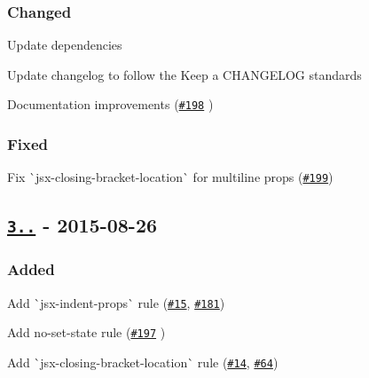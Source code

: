 \subsubsection*{Changed}


\begin{DoxyItemize}
\item Update dependencies
\item Update changelog to follow the Keep a C\+H\+A\+N\+G\+E\+L\+OG standards
\item Documentation improvements (\href{https://github.com/yannickcr/eslint-plugin-react/pull/198}{\tt \#198} )
\end{DoxyItemize}

\subsubsection*{Fixed}


\begin{DoxyItemize}
\item Fix \`{}jsx-\/closing-\/bracket-\/location\`{} for multiline props (\href{https://github.com/yannickcr/eslint-plugin-react/issues/199}{\tt \#199})
\end{DoxyItemize}

\subsection*{\href{https://github.com/yannickcr/eslint-plugin-react/compare/v3.2.3...v3.3.0}{\tt 3..} -\/ 2015-\/08-\/26}

\subsubsection*{Added}


\begin{DoxyItemize}
\item Add \`{}jsx-\/indent-\/props\`{} rule (\href{https://github.com/yannickcr/eslint-plugin-react/issues/15}{\tt \#15}, \href{https://github.com/yannickcr/eslint-plugin-react/issues/181}{\tt \#181})
\item Add {\ttfamily no-\/set-\/state rule} (\href{https://github.com/yannickcr/eslint-plugin-react/pull/197}{\tt \#197} )
\item Add \`{}jsx-\/closing-\/bracket-\/location\`{} rule (\href{https://github.com/yannickcr/eslint-plugin-react/issues/14}{\tt \#14}, \href{https://github.com/yannickcr/eslint-plugin-react/issues/64}{\tt \#64})
\end{DoxyItemize}

